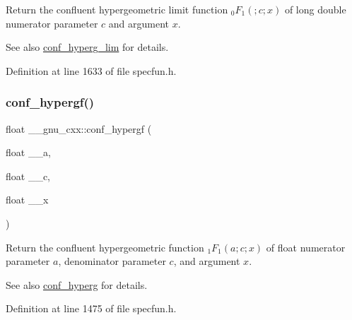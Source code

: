 Return the confluent hypergeometric limit function $ {}_0F_1(;c;x) $ of {\ttfamily long double} numerator parameter $ c $ and argument $ x $.

\begin{DoxySeeAlso}{See also}
\hyperlink{group__gnu__math__spec__func_ga9fe7a5e2e741f56d88fd29bc249feab2}{conf\+\_\+hyperg\+\_\+lim} for details. 
\end{DoxySeeAlso}


Definition at line 1633 of file specfun.\+h.

\mbox{\label{group__gnu__math__spec__func_gabd18e600aa78c3f2b2f835039506c810}} 
\subsubsection{\texorpdfstring{conf\+\_\+hypergf()}{conf\_hypergf()}}
{\footnotesize\ttfamily float \+\_\+\+\_\+gnu\+\_\+cxx\+::conf\+\_\+hypergf (\begin{DoxyParamCaption}\item[{float}]{\+\_\+\+\_\+a,  }\item[{float}]{\+\_\+\+\_\+c,  }\item[{float}]{\+\_\+\+\_\+x }\end{DoxyParamCaption})\hspace{0.3cm}{\ttfamily [inline]}}

Return the confluent hypergeometric function $ {}_1F_1(a;c;x) $ of {\ttfamily float} numerator parameter $ a $, denominator parameter $ c $, and argument $ x $.

\begin{DoxySeeAlso}{See also}
\hyperlink{group__gnu__math__spec__func_ga4d01e85e7d295afca5d9f8b6c68f19cc}{conf\+\_\+hyperg} for details. 
\end{DoxySeeAlso}


Definition at line 1475 of file specfun.\+h.

\mbox{\label{group__gnu__math__spec__func_ga0a9853f30d8fa515a12cd45a92da832e}} 
